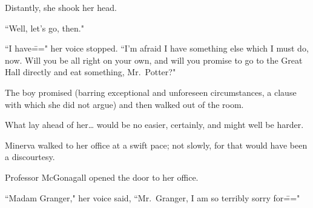 Distantly, she shook her head.

``Well, let's go, then."

``I have\===" her voice stopped. ``I'm afraid I have something else which I must do, now. Will you be all right on your own, and will you promise to go to the Great Hall directly and eat something, Mr.~Potter?"

The boy promised (barring exceptional and unforeseen circumstances, a clause with which she did not argue) and then walked out of the room.

What lay ahead of her{\ldots} would be no easier, certainly, and might well be harder.

\later

Minerva walked to her office at a swift pace; not slowly, for that would have been a discourtesy.

Professor McGonagall opened the door to her office.

``Madam Granger," her voice said, ``Mr.~Granger, I am so terribly sorry for\==="

